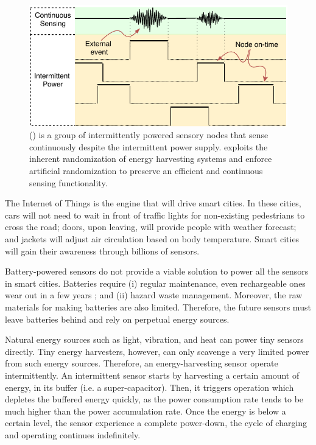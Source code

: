 \begin{figure}
	\centering
	\includegraphics[width=\columnwidth]{figures/coalInterSen}
	\caption{\fullsys (\sys) is a group of intermittently powered sensory nodes that sense continuously despite the intermittent power supply. \sys exploits the inherent randomization of energy harvesting systems and enforce artificial randomization to preserve an efficient and continuous sensing functionality.}
	\label{fig:powerCycle}
\end{figure}

The Internet of Things is the engine that will drive smart cities. In these cities, cars will not need to wait in front of traffic lights for non-existing pedestrians to cross the road; doors, upon leaving, will provide people with weather forecast; and jackets will adjust air circulation based on body temperature. Smart cities will gain their awareness through billions of sensors.

Battery-powered sensors do not provide a viable solution to power all the sensors in smart cities. Batteries require (i) regular maintenance, even rechargeable ones wear out in a few years \cite{xxx}; and (ii) hazard waste management. Moreover, the raw materials for making batteries are  also limited. Therefore, the future sensors must leave batteries behind and rely on perpetual energy sources. 

Natural energy sources such as light, vibration, and heat can power tiny sensors directly. Tiny energy harvesters, however, can only scavenge a very limited power from such energy sources. Therefore, an energy-harvesting sensor operate intermittently. An intermittent sensor starts by harvesting a certain amount of energy, in its buffer (i.e. a super-capacitor). Then, it triggers operation which depletes the buffered energy quickly, as the power consumption rate tends to be much higher than the power accumulation rate. Once the energy is below a certain level, the sensor experience a complete power-down, the cycle of charging and operating continues indefinitely.

